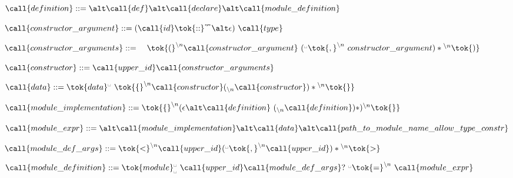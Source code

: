  
   \item $\call{definition} ::= \\
   \alt \call{def}\\
   \alt \call{declare}\\
   \alt \call{module\_definition}$
    
 
  \item $\call{constructor\_argument} ::=
    ( \call{id} \tok{::}^\nleftrightarrow \alt \epsilon)\ \call{type}$
  \item $\call{constructor\_arguments} ::=\\
   \quad\tok{(}^{\backslash{}n} \call{constructor\_argument}\ ( {}^\textrm\textvisiblespace\tok{,}^{\backslash{}n}\ {constructor\_argument} )* {}^{\backslash{}n}\tok{)}$
   
 
   \item $\call{constructor} ::= \call{upper\_id}\call{constructor\_arguments}$
    

  \item $\call{data} ::= \tok{data}^\textrm\textvisiblespace\ \tok{\{}^{\backslash{}n} \call{constructor} ({}_{\backslash{}n} \call{constructor} )* {}^{\backslash{}n}\tok{\}}$
   
 
   \item $\call{module\_implementation} ::= \tok{\{}^{\backslash{}n} (\epsilon \alt
   \call{definition}\ ({}_{\backslash{}n}\call{definition})* ) {}^{\backslash{}n}\tok{\}}$
    
 
   \item $\call{module\_expr} ::=\\
   \alt \call{module\_implementation}\\
   \alt \call{data}\\
   \alt \call{path\_to\_module\_name\_allow\_type\_constr}$
    
 
   \item $\call{module\_def\_args} ::= \tok{<}^{\backslash{}n} \call{upper\_id}
   ({}^\textrm\textvisiblespace\tok{,}^{\backslash{}n} \call{upper\_id})* {}^{\backslash{}n}\tok{>}$\\
   \item $\call{module\_definition} ::=
   \tok{module}_\textrm\textvisiblespace^\textrm\textvisiblespace\ \call{upper\_id}\call{module\_def\_args}?\ {}^\textrm\textvisiblespace\tok{=}^{\backslash{}n}\ \call{module\_expr}$
   
